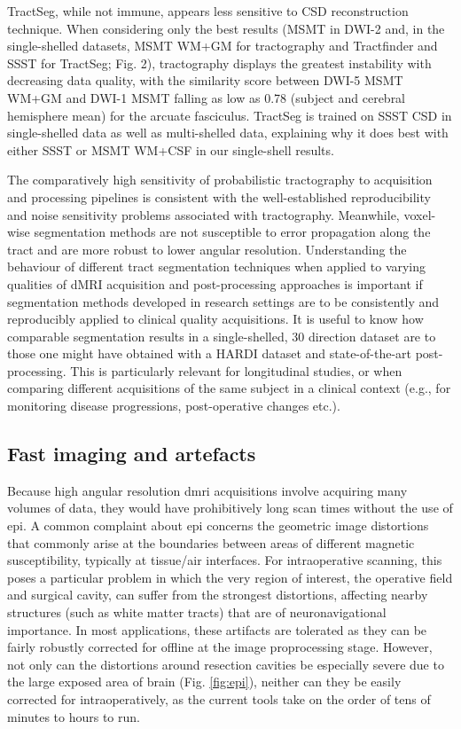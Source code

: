TractSeg, while not immune, appears less sensitive to CSD reconstruction technique.
When considering only the best results (MSMT in DWI-2 and, in the single-shelled datasets, MSMT WM+GM for tractography and Tractfinder and SSST for TractSeg; Fig. 2), tractography displays the greatest instability with decreasing data quality, with the similarity score between DWI-5 MSMT WM+GM and DWI-1 MSMT falling as low as 0.78 (subject and cerebral hemisphere mean) for the arcuate fasciculus.
TractSeg is trained on SSST CSD in single-shelled data as well as multi-shelled data, explaining why it does best with either SSST or MSMT WM+CSF in our single-shell results.

The comparatively high sensitivity of probabilistic tractography to acquisition and processing pipelines is consistent with the well-established reproducibility and noise sensitivity problems associated with tractography.
Meanwhile, voxel-wise segmentation methods are not susceptible to error propagation along the tract and are more robust to lower angular resolution.
Understanding the behaviour of different tract segmentation techniques when applied to varying qualities of dMRI acquisition and post-processing approaches is important if segmentation methods developed in research settings are to be consistently and reproducibly applied to clinical quality acquisitions.
It is useful to know how comparable segmentation results in a single-shelled, 30 direction dataset are to those one might have obtained with a HARDI dataset and state-of-the-art post-processing.
This is particularly relevant for longitudinal studies, or when comparing different acquisitions of the same subject in a clinical context (e.g., for monitoring disease progressions, post-operative changes etc.).

\subsection{Fast imaging and artefacts}

Because high angular resolution \gls{dmri} acquisitions involve acquiring many volumes of data, they would have prohibitively long scan times without the use of \gls{epi}.
A common complaint about \gls{epi} concerns the geometric image distortions that commonly arise at the boundaries between areas of different magnetic susceptibility, typically at tissue/air interfaces.
For intraoperative scanning, this poses a particular problem in which the very region of interest, the operative field and surgical cavity, can suffer from the strongest distortions, affecting nearby structures (such as white matter tracts) that are of neuronavigational importance.\autocite{Yang2022}
In most applications, these artifacts are tolerated as they can be fairly robustly corrected for offline at the image proprocessing stage.
However, not only can the distortions around resection cavities be especially severe due to the large exposed area of brain (Fig. \ref{fig:epi}), neither can they be easily corrected for intraoperatively, as the current tools take on the order of tens of minutes to hours to run.

